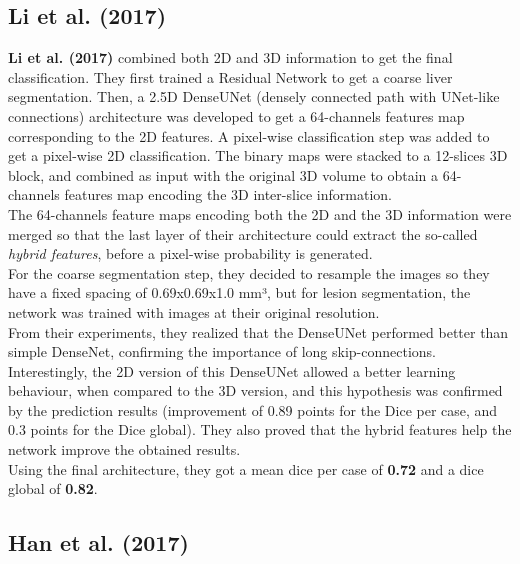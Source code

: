 \subsection*{Li et al. (2017)}\label{li-et-al.-2017}

\textbf{Li et al. (2017)} combined both 2D and 3D information to get the
final classification. They first trained a Residual Network to get a
coarse liver segmentation. Then, a 2.5D DenseUNet (densely connected
path with UNet-like connections) architecture was developed to get a
64-channels features map corresponding to the 2D features. A pixel-wise
classification step was added to get a pixel-wise 2D classification. The
binary maps were stacked to a 12-slices 3D block, and combined as input
with the original 3D volume to obtain a 64-channels features map
encoding the 3D inter-slice information.\\
The 64-channels feature maps encoding both the 2D and the 3D information
were merged so that the last layer of their architecture could extract
the so-called \emph{hybrid features}, before a pixel-wise probability is
generated.\\
For the coarse segmentation step, they decided to resample the images so
they have a fixed spacing of 0.69x0.69x1.0 mm³, but for lesion
segmentation, the network was trained with images at their original
resolution.\\
From their experiments, they realized that the DenseUNet performed
better than simple DenseNet, confirming the importance of long
skip-connections. Interestingly, the 2D version of this DenseUNet
allowed a better learning behaviour, when compared to the 3D version,
and this hypothesis was confirmed by the prediction results (improvement
of 0.89 points for the Dice per case, and 0.3 points for the Dice
global). They also proved that the hybrid features help the network
improve the obtained results.\\
Using the final architecture, they got a mean dice per case of \textbf{0.72}
and a dice global of \textbf{0.82}.

\subsection*{Han et al. (2017)}\label{han-et-al.-2017}

